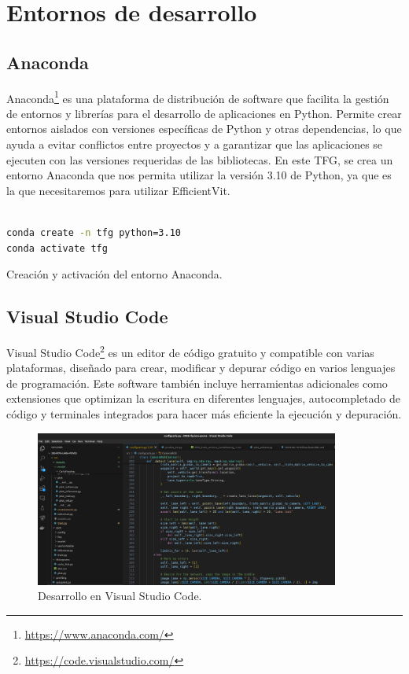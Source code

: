 \section{Entornos de desarrollo}
\label{sec:des}

\subsection{Anaconda}
\label{sec:conda}

Anaconda\footnote{\url{https://www.anaconda.com/}} es una plataforma de distribución de software que facilita la gestión de entornos y librerías para el desarrollo de aplicaciones en Python. Permite crear entornos aislados con versiones específicas de Python y otras dependencias, lo que ayuda a evitar conflictos entre proyectos y a garantizar que las aplicaciones se ejecuten con las versiones requeridas de las bibliotecas. En este \ac{TFG}, se crea un entorno Anaconda que nos permita utilizar la versión 3.10 de Python, ya que es la que necesitaremos para utilizar EfficientVit.

\begin{code}[h]
\begin{lstlisting}[language=bash]

conda create -n tfg python=3.10
conda activate tfg

\end{lstlisting}
\caption[Creación del entorno Anaconda]{Creación y activación del entorno Anaconda.}
\label{cod:anaconda}
\end{code}

\subsection{Visual Studio Code}
\label{sec:vs_code}

Visual Studio Code\footnote{\url{https://code.visualstudio.com/}} es un editor de código gratuito y compatible con varias plataformas, diseñado para crear, modificar y depurar código en varios lenguajes de programación. Este software también incluye herramientas adicionales como extensiones que optimizan la escritura en diferentes lenguajes, autocompletado de código y terminales integrados para hacer más eficiente la ejecución y depuración.

\begin{figure}[ht]
  \begin{center}
    \includegraphics[width=10cm]{figs/Plataformas_Desarollo/visual_code.png}
  \end{center}
  \caption{Desarrollo en Visual Studio Code.}
  \label{foto_code}
\end{figure}

